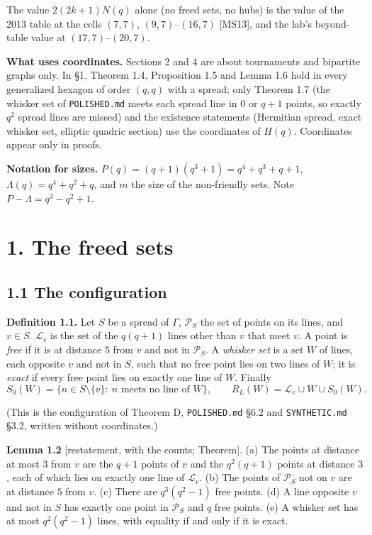 \documentclass[
  10pt,
]{article}
\begin{document}
The value \(2(2k+1)N(q)\) alone (no freed sets, no hubs) is the value of
the 2013 table at the cells \((7,7)\), \((9,7)\)--\((16,7)\) {[}MS13{]},
and the lab's beyond-table value at \((17,7)\)--\((20,7)\).

\textbf{What uses coordinates.} Sections 2 and 4 are about tournaments
and bipartite graphs only. In §1, Theorem 1.4, Proposition 1.5 and Lemma
1.6 hold in every generalized hexagon of order \((q,q)\) with a spread;
only Theorem 1.7 (the whisker set of \texttt{POLISHED.md} meets each
spread line in \(0\) or \(q+1\) points, so exactly \(q^2\) spread lines
are missed) and the existence statements (Hermitian spread, exact
whisker set, elliptic quadric section) use the coordinates of \(H(q)\).
Coordinates appear only in proofs.

\textbf{Notation for sizes.} \(P(q)=(q+1)(q^3+1)=q^4+q^3+q+1\),
\(\Lambda(q)=q^4+q^2+q\), and \(m\) the size of the non-friendly sets.
Note \(P-\Lambda=q^3-q^2+1\).

\hypertarget{the-freed-sets}{%
\section{1. The freed sets}\label{the-freed-sets}}

\hypertarget{the-configuration}{%
\subsection{1.1 The configuration}\label{the-configuration}}

\textbf{Definition 1.1.} Let \(S\) be a spread of \(\Gamma\),
\(\mathcal P_S\) the set of points on its lines, and \(v\in S\).
\(\mathcal L_v\) is the set of the \(q(q+1)\) lines other than \(v\)
that meet \(v\). A point is \emph{free} if it is at distance \(5\) from
\(v\) and not in \(\mathcal P_S\). A \emph{whisker set} is a set \(W\)
of lines, each opposite \(v\) and not in \(S\), such that no free point
lies on two lines of \(W\); it is \emph{exact} if every free point lies
on exactly one line of \(W\). Finally
\[S_0(W)=\{n\in S\setminus\{v\}:\ n\text{ meets no line of }W\},\qquad R_L(W)=\mathcal L_v\cup W\cup S_0(W).\]

(This is the configuration of Theorem D, \texttt{POLISHED.md} §6.2 and
\texttt{SYNTHETIC.md} §3.2, written without coordinates.)

\textbf{Lemma 1.2} {[}restatement, with the counts; Theorem{]}. (a) The
points at distance at most \(3\) from \(v\) are the \(q+1\) points of
\(v\) and the \(q^2(q+1)\) points at distance \(3\), each of which lies
on exactly one line of \(\mathcal L_v\). (b) The points of
\(\mathcal P_S\) not on \(v\) are at distance \(5\) from \(v\). (c)
There are \(q^3(q^2-1)\) free points. (d) A line opposite \(v\) and not
in \(S\) has exactly one point in \(\mathcal P_S\) and \(q\) free
points. (e) A whisker set has at most \(q^2(q^2-1)\) lines, with
equality if and only if it is exact.
\end{document}

